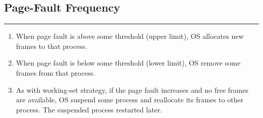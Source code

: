 \documentclass[12pt,onecolumn]{IEEEtran}
\begin{document}
\subsection{Page-Fault Frequency}
\hrule
\vspace{3mm}
\begin{enumerate}
	\item When page fault is above some threshold (upper limit),  OS allocates new frames to that process.
	\item When page fault is below some threshold (lower limit), OS remove some frames from that process.
	\item As with working-set strategy, if the page fault increases and no free frames are available, OS suspend some process and reallocate its frames to other process. The suspended process restarted later.
\end{enumerate}
\begin{center}
\end{center} 
\end{document}
